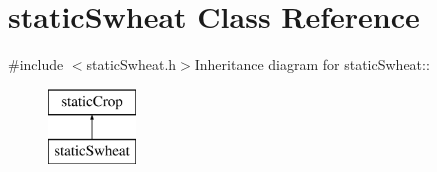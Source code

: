 \hypertarget{classstatic_swheat}{
\section{staticSwheat Class Reference}
\label{classstatic_swheat}
}


{\ttfamily \#include $<$staticSwheat.h$>$}Inheritance diagram for staticSwheat::\begin{figure}[H]
\begin{center}
\leavevmode
\includegraphics[height=2cm]{classstatic_swheat}
\end{center}
\end{figure}
